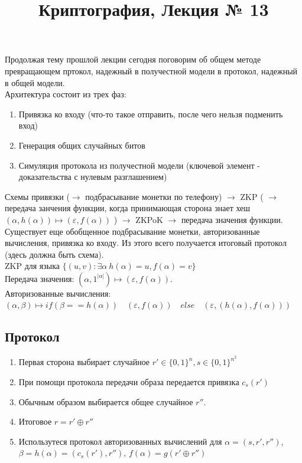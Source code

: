 \documentclass[a4paper]{article}
\title{Криптография, Лекция № 13}
\theoremstyle{definition}
\theoremstyle{plain}
\begin{document}
\maketitle

\noindent Продолжая тему прошлой лекции сегодня поговорим об общем методе превращающем пртокол, надежный в 
получестной модели в протокол, надежный в общей модели. ~\\

\noindent Архитектура состоит из трех фаз:
\begin{enumerate}
	\item Привязка ко входу (что-то такое отправить, после чего нельзя подменить вход)
	\item Генерация общих случайных битов
	\item Симуляция протокола из получестной модели
		(ключевой элемент - доказательства с нулевым разглашением)
\end{enumerate}

\noindent Схемы привязки ($\rightarrow$ подбрасывание монетки по телефону)
$\rightarrow$ ZKP ( $\rightarrow$ передача занчения функции,
когда принимающая сторона знает хеш $(\alpha, h(\alpha)) \mapsto (\varepsilon, f(\alpha))$ ) $\rightarrow$
ZKPoK $\rightarrow$ передача значения функции. Существует еще обобщенное
подбрасывание монетки, авторизованные вычисления, привязка ко входу. Из этого 
всего получается итоговый протокол (здесь должна быть схема).~\\

\noindent ZKP для языка $\{(u, v): \exists \alpha\ h(\alpha) = u, f(\alpha) = v\}$~\\
\noindent Передача значения: $(\alpha, 1^{|\alpha|}) \mapsto (\varepsilon, f(\alpha))$.~\\
\noindent Авторизованные вычисления:
$(\alpha, \beta) \mapsto if (\beta == h(\alpha))\quad (\varepsilon, f(\alpha))\quad else\quad (\varepsilon, (h(\alpha), f(\alpha)))$~\\

\subsection{Протокол}

\begin{enumerate}
	\item Первая сторона выбирает случайное $r' \in \{0, 1\}^n, s \in \{0, 1\}^{n^2}$
	\item При помощи протокола передачи образа передается привязка $c_s(r')$
	\item Обычным образом выбирается общее случайное $r''$.
	\item Итоговое $r = r' \oplus r''$
	\item Использутеся протокол авторизованных вычислений для $\alpha = (s, r', r'')$,
		$\beta = h(\alpha) = (c_s(r'), r'')$, $f(\alpha) = g(r' \oplus r'')$ 
\end{enumerate}
\end{document}
